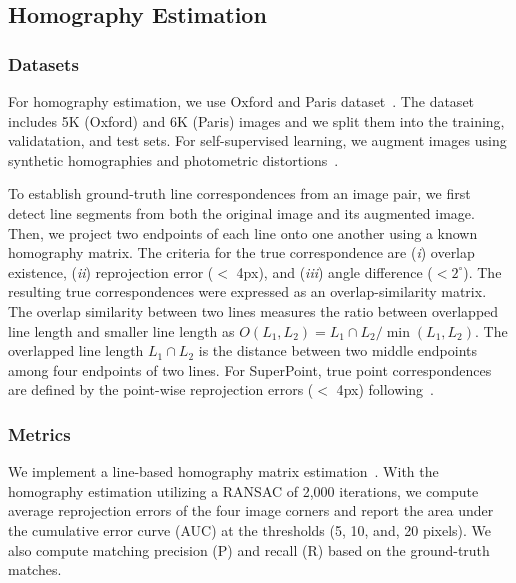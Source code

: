 \documentclass[letterpaper, 10 pt, journal, twoside]{ieeetran}
\begin{document}
\subsection{Homography Estimation}

\subsubsection{Datasets}

For homography estimation, we use Oxford and Paris dataset~\cite{Radenovic2018}. The dataset includes 5K (Oxford) and 6K (Paris) images and we split them into the training, validatation, and test sets. For self-supervised learning, we augment images using synthetic homographies and photometric distortions~\cite{DeTone2017, Sarlin2019, Revaud2019}.

To establish ground-truth line correspondences from an image pair, we first detect line segments from both the original image and its augmented image. Then, we project two endpoints of each line onto one another using a known homography matrix. The criteria for the true correspondence are (\textit{i}) overlap existence, (\textit{ii}) reprojection error ($<$ \unit{4}{px}), and (\textit{iii}) angle difference ($<2^\circ$). The resulting true correspondences were expressed as an overlap-similarity matrix. The overlap similarity between two lines measures the ratio between overlapped line length and smaller line length as $O(L_1,L_2) = L_1 \cap L_2 / \min(L_1,L_2)$. The overlapped line length $L_1 \cap L_2$ is the distance between two middle endpoints among four endpoints of two lines. For SuperPoint, true point correspondences are defined by the point-wise reprojection errors  ($<$ \unit{4}{px}) following~\cite{Sarlin2019}.



\subsubsection{Metrics}

We implement a line-based homography matrix estimation~\cite{Dubrofsky2008}. With the homography estimation utilizing a \ac{RANSAC} of 2,000 iterations, we compute average reprojection errors of the four image corners and report the area under the cumulative error curve (AUC) at the thresholds (5, 10, and, 20 pixels). We also compute matching precision (P) and recall (R) based on the ground-truth matches.
\end{document}
